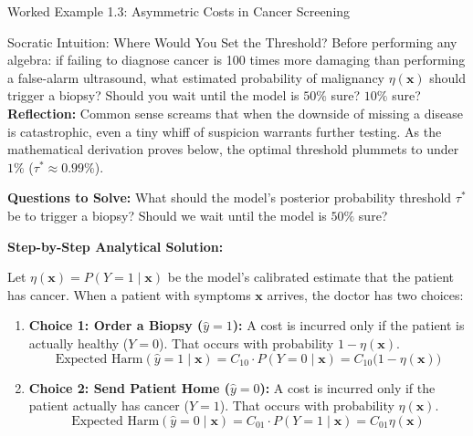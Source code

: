 \begin{examplebox}{Worked Example 1.3: Asymmetric Costs in Cancer Screening}
\begin{ponderbox}{Socratic Intuition: Where Would You Set the Threshold?}
Before performing any algebra: if failing to diagnose cancer is 100 times more damaging than performing a false-alarm ultrasound, what estimated probability of malignancy $\eta(\mathbf{x})$ should trigger a biopsy? Should you wait until the model is $50\%$ sure? $10\%$ sure?
\tcblower
\textbf{Reflection:} Common sense screams that when the downside of missing a disease is catastrophic, even a tiny whiff of suspicion warrants further testing. As the mathematical derivation proves below, the optimal threshold plummets to under $1\%$ ($\tau^* \approx 0.99\%$).
\end{ponderbox}

\textbf{Questions to Solve:}
What should the model's posterior probability threshold $\tau^*$ be to trigger a biopsy? Should we wait until the model is $50\%$ sure?

\tcblower
\textbf{Step-by-Step Analytical Solution:}

Let $\eta(\mathbf{x}) = P(Y = 1 \mid \mathbf{x})$ be the model's calibrated estimate that the patient has cancer.
When a patient with symptoms $\mathbf{x}$ arrives, the doctor has two choices:
\begin{enumerate}
    \item \textbf{Choice 1: Order a Biopsy ($\hat{y} = 1$):}
    A cost is incurred only if the patient is actually healthy ($Y = 0$). That occurs with probability $1 - \eta(\mathbf{x})$.
    \begin{equation*}
    \text{Expected Harm}(\hat{y} = 1 \mid \mathbf{x}) = C_{10} \cdot P(Y = 0 \mid \mathbf{x}) = C_{10} \big(1 - \eta(\mathbf{x})\big)
    \end{equation*}
    \item \textbf{Choice 2: Send Patient Home ($\hat{y} = 0$):}
    A cost is incurred only if the patient actually has cancer ($Y = 1$). That occurs with probability $\eta(\mathbf{x})$.
    \begin{equation*}
    \text{Expected Harm}(\hat{y} = 0 \mid \mathbf{x}) = C_{01} \cdot P(Y = 1 \mid \mathbf{x}) = C_{01} \eta(\mathbf{x})
    \end{equation*}
\end{enumerate}


\end{examplebox}
